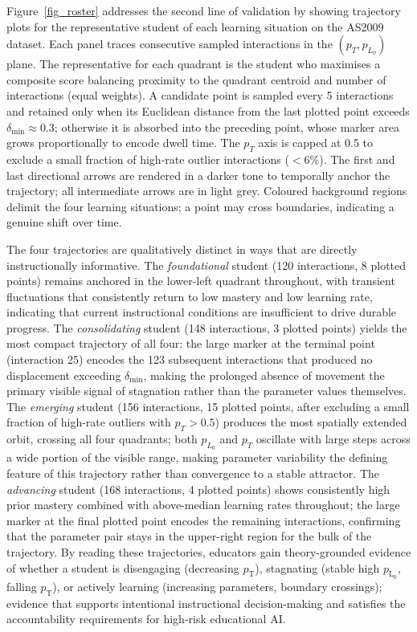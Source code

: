 \documentclass[runningheads]{llncs}
\begin{document}
Figure~\ref{fig_roster} addresses the second line of validation by showing trajectory plots for the representative student of each learning situation on the AS2009 dataset. Each panel traces consecutive sampled interactions in the $(p_T, p_{L_0})$ plane. The representative for each quadrant is the student who maximises a composite score balancing proximity to the quadrant centroid and number of interactions (equal weights). A candidate point is sampled every 5 interactions and retained only when its Euclidean distance from the last plotted point exceeds $\delta_{\min}\approx 0.3$; otherwise it is absorbed into the preceding point, whose marker area grows proportionally to encode dwell time. The $p_T$ axis is capped at 0.5 to exclude a small fraction of high-rate outlier interactions ($<$6\%). The first and last directional arrows are rendered in a darker tone to temporally anchor the trajectory; all intermediate arrows are in light grey. Coloured background regions delimit the four learning situations; a point may cross boundaries, indicating a genuine shift over time.

The four trajectories are qualitatively distinct in ways that are directly instructionally informative. The \textit{foundational} student (120 interactions, 8 plotted points) remains anchored in the lower-left quadrant throughout, with transient fluctuations that consistently return to low mastery and low learning rate, indicating that current instructional conditions are insufficient to drive durable progress. The \textit{consolidating} student (148 interactions, 3 plotted points) yields the most compact trajectory of all four: the large marker at the terminal point (interaction 25) encodes the 123 subsequent interactions that produced no displacement exceeding $\delta_{\min}$, making the prolonged absence of movement the primary visible signal of stagnation rather than the parameter values themselves. The \textit{emerging} student (156 interactions, 15 plotted points, after excluding a small fraction of high-rate outliers with $p_T > 0.5$) produces the most spatially extended orbit, crossing all four quadrants; both $p_{L_0}$ and $p_T$ oscillate with large steps across a wide portion of the visible range, making parameter variability the defining feature of this trajectory rather than convergence to a stable attractor. The \textit{advancing} student (168 interactions, 4 plotted points) shows consistently high prior mastery combined with above-median learning rates throughout; the large marker at the final plotted point encodes the remaining interactions, confirming that the parameter pair stays in the upper-right region for the bulk of the trajectory. By reading these trajectories, educators gain theory-grounded evidence of whether a student is disengaging (decreasing $p_{\text{T}}$), stagnating (stable high $p_{\text{L}_0}$, falling $p_{\text{T}}$), or actively learning (increasing parameters, boundary crossings); evidence that supports intentional instructional decision-making and satisfies the accountability requirements for high-risk educational AI.
\end{document}
